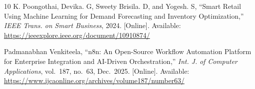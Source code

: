 \documentclass[journal]{IEEEtran}
\begin{document}
\begin{thebibliography}{10}
K. Poongothai, Devika. G, Sweety Brisila. D, and Yogesh. S, ``Smart Retail Using Machine Learning for Demand Forecasting and Inventory Optimization,'' \emph{IEEE Trans. on Smart Business}, 2024. [Online]. Available: \url{https://ieeexplore.ieee.org/document/10910874/}

Padmanabhan Venkiteela, ``n8n: An Open-Source Workflow Automation Platform for Enterprise Integration and AI-Driven Orchestration,'' \emph{Int. J. of Computer Applications}, vol.~187, no.~63, Dec.~2025. [Online]. Available: \url{https://www.ijcaonline.org/archives/volume187/number63/}

\end{thebibliography}
\end{document}
